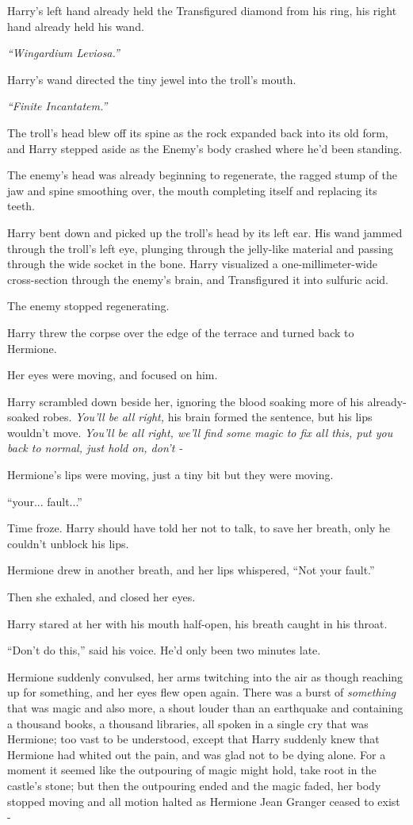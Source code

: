 Harry's left hand already held the Transfigured diamond from his ring,
his right hand already held his wand.

\emph{``Wingardium Leviosa.''}

Harry's wand directed the tiny jewel into the troll's mouth.

\emph{``Finite Incantatem.''}

The troll's head blew off its spine as the rock expanded back into its
old form, and Harry stepped aside as the Enemy's body crashed where he'd
been standing.

The enemy's head was already beginning to regenerate, the ragged stump
of the jaw and spine smoothing over, the mouth completing itself and
replacing its teeth.

Harry bent down and picked up the troll's head by its left ear. His wand
jammed through the troll's left eye, plunging through the jelly-like
material and passing through the wide socket in the bone. Harry
visualized a one-millimeter-wide cross-section through the enemy's
brain, and Transfigured it into sulfuric acid.

The enemy stopped regenerating.

Harry threw the corpse over the edge of the terrace and turned back to
Hermione.

Her eyes were moving, and focused on him.

Harry scrambled down beside her, ignoring the blood soaking more of his
already-soaked robes. \emph{You'll be all right,} his brain formed the
sentence, but his lips wouldn't move. \emph{You'll be all right, we'll
find some magic to fix all this, put you back to normal, just hold on,
don't -}

Hermione's lips were moving, just a tiny bit but they were moving.

``your... fault...''

Time froze. Harry should have told her not to talk, to save her breath,
only he couldn't unblock his lips.

Hermione drew in another breath, and her lips whispered, ``Not your
fault.''

Then she exhaled, and closed her eyes.

Harry stared at her with his mouth half-open, his breath caught in his
throat.

``Don't do this,'' said his voice. He'd only been two minutes late.

Hermione suddenly convulsed, her arms twitching into the air as though
reaching up for something, and her eyes flew open again. There was a
burst of \emph{something} that was magic and also more, a shout louder
than an earthquake and containing a thousand books, a thousand
libraries, all spoken in a single cry that was Hermione; too vast to be
understood, except that Harry suddenly knew that Hermione had whited out
the pain, and was glad not to be dying alone. For a moment it seemed
like the outpouring of magic might hold, take root in the castle's
stone; but then the outpouring ended and the magic faded, her body
stopped moving and all motion halted as Hermione Jean Granger ceased to
exist -

